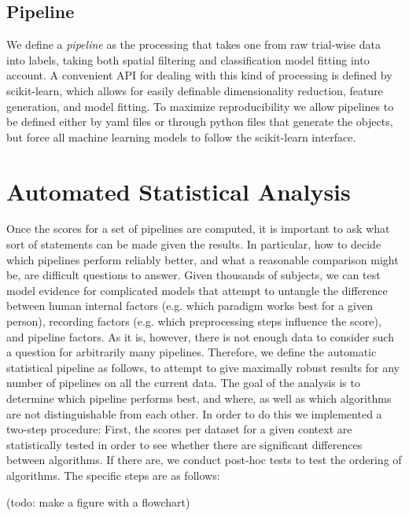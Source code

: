 \subsection{Pipeline}

We define a \emph{pipeline} as the processing that takes one from raw trial-wise
data into labels, taking both spatial filtering and classification model fitting
into account. A convenient API for dealing with this kind of processing is
defined by scikit-learn\cite{Pedregosa2011}, which allows for easily definable
dimensionality reduction, feature generation, and model fitting. To maximize reproducibility we allow pipelines to be defined either by yaml files or through python files that generate the objects, but force all machine learning models to follow the scikit-learn interface. 

\section{Automated Statistical Analysis}
\label{stats}
Once the scores for a set of pipelines are computed, it is important to ask what
sort of statements can be made given the results. In particular, how to decide
which pipelines perform reliably better, and what a reasonable comparison might
be, are difficult questions to answer. Given thousands of subjects, we can test
model evidence for complicated models that attempt to untangle the difference
between human internal factors (e.g. which paradigm works best for a given
person), recording factors (e.g. which preprocessing steps influence the score),
and pipeline factors. As it is, however, there is not enough data to consider
such a question for arbitrarily many pipelines. Therefore, we define the
automatic statistical pipeline as follows, to attempt to give maximally robust
results for any number of pipelines on all the current data. The goal of the
analysis is to determine which pipeline performs best, and where, as well as
which algorithms are not distinguishable from each other. In order to do this we
implemented a two-step procedure: First, the scores per dataset for a given
context are statistically tested in order to see whether there
are significant differences between algorithms. If there are, we conduct
post-hoc tests to test the ordering of algorithms. The specific steps are as
follows:

(todo: make a figure with a flowchart)

